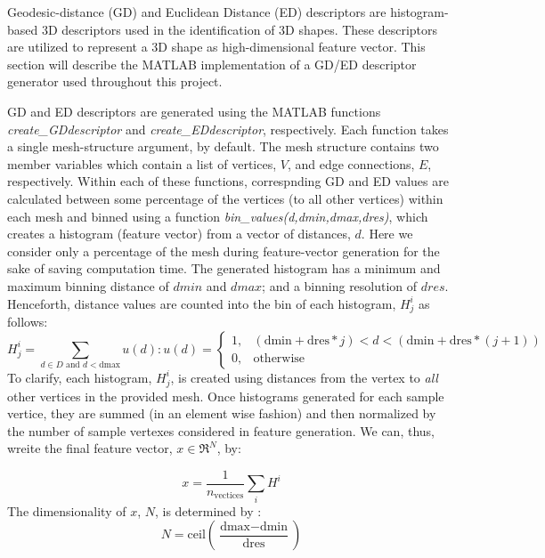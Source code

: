 \documentclass[12pt]{article}
\begin{document}
	\noindent
	Geodesic-distance (GD) and Euclidean Distance (ED) descriptors are histogram-based 3D descriptors used in the identification of 3D shapes. These descriptors are utilized to represent a 3D shape as high-dimensional feature vector. This section will describe the MATLAB implementation of a GD/ED descriptor generator used throughout this project.

	\noindent
	 GD and ED descriptors are generated using the MATLAB functions \emph{create\_GDdescriptor} and \emph{create\_EDdescriptor}, respectively. Each function takes a single mesh-structure argument, by default. The mesh structure contains two member variables which contain a list of vertices, $V$, and edge connections, $E$, respectively. Within each of these functions, correspnding GD and ED values are calculated between some percentage of the vertices (to all other vertices) within each mesh and binned using a function  \emph{bin\_values(d,dmin,dmax,dres)}, which creates a histogram (feature vector) from a vector of distances, $d$. Here we consider only a percentage of the mesh during feature-vector generation for the sake of saving computation time. The generated histogram has a minimum and maximum binning distance of $dmin$ and $dmax$; and a binning resolution of $dres$. Henceforth, distance values are counted into the \jth bin of each \ith histogram, $H_{j}^{i}$ as follows:
	\begin{equation}
    		H_{j}^{i} = 
		\sum_{d \in D \text{ and } d < \text{dmax}} u(d) : u(d) = 
		\begin{cases}
    		1,	& (\text{dmin} + \text{dres}*j) < d < (\text{dmin} + \text{dres}*(j+1))  \\
    		0,   & \text{otherwise}
		\end{cases}
	\end{equation}
	To clarify, each histogram,  $H_{j}^{i}$, is created using distances from the \ith vertex to \emph{all} other vertices in the provided mesh. Once histograms generated for each sample vertice, they are summed (in an element wise fashion) and then normalized by the number of sample vertexes considered in feature generation. We can, thus, wreite the final feature vector, $x\in\Re^{N}$, by:

	\begin{equation}
		x = \frac{1}{n_{\text{vectices}}}\sum_{i} H^{i}
	\end{equation}
	The dimensionality of $x$, $N$, is determined by :
	\begin{equation}
		N = \text{ceil}\left( \frac{\text{dmax} - \text{dmin} }{\text{dres}} \right)
	\end{equation}
\end{document}
